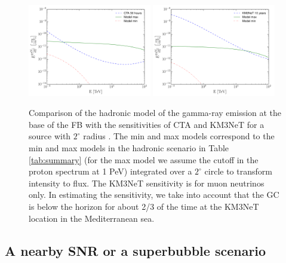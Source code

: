 \begin{figure}[h]
\centering
 \includegraphics[width=0.48\textwidth]{plots/low_lat_FB_CTA.pdf}
 \includegraphics[width=0.48\textwidth]{plots/low_lat_FB_KM3.pdf}
 \caption{Comparison of the hadronic model of the gamma-ray emission at the base of the FB
 with the sensitivities of CTA and KM3NeT for a source with $2^\circ$ radius \citep{2018APh...100...69A}.
 The min and max models correspond to the min and max models in
 the hadronic scenario in Table \ref{tab:summary} (for the max model we assume the cutoff in the proton spectrum at 1 PeV)
 integrated over a $2^\circ$ circle to transform intensity to flux.
 The KM3NeT sensitivity is for muon neutrinos only.
 In estimating the sensitivity, we take into account that the GC is below the horizon for about 2/3 of the time
 at the KM3NeT location in the Mediterranean sea.
 }
 \label{fig:sensitivities}
\end{figure}


\subsection{A nearby SNR or a superbubble scenario}

